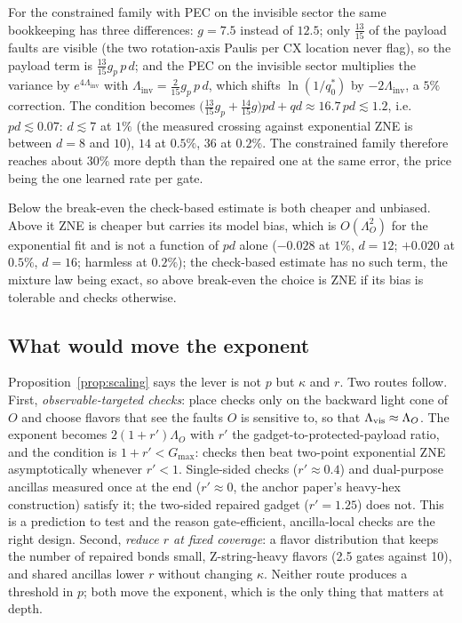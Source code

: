 \documentclass[11pt,a4paper]{article}
\theoremstyle{remark}
\newcommand{\inv}{\mathrm{inv}}
\begin{document}
For the constrained family with PEC on the invisible sector the same bookkeeping has three differences: $g=7.5$ instead of $12.5$; only $\tfrac{13}{15}$ of the payload faults are visible (the two rotation-axis Paulis per CX location never flag), so the payload term is $\tfrac{13}{15}g_p\,p\,d$; and the PEC on the invisible sector multiplies the variance by $e^{4\Lambda_\inv}$ with $\Lambda_\inv=\tfrac{2}{15}g_p\,p\,d$, which shifts $\ln(1/q_0^\ast)$ by $-2\Lambda_\inv$, a $5\%$ correction. The condition becomes $\bigl(\tfrac{13}{15}g_p+\tfrac{14}{15}g\bigr)pd+qd\approx16.7\,pd\lesssim1.2$, i.e.\ $pd\lesssim0.07$: $d\lesssim7$ at $1\%$ (the measured crossing against exponential ZNE is between $d=8$ and $10$), $14$ at $0.5\%$, $36$ at $0.2\%$. The constrained family therefore reaches about $30\%$ more depth than the repaired one at the same error, the price being the one learned rate per gate.

Below the break-even the check-based estimate is both cheaper and unbiased. Above it ZNE is cheaper but carries its model bias, which is $O(\Lambda_O^2)$ for the exponential fit and is not a function of $pd$ alone ($-0.028$ at $1\%$, $d=12$; $+0.020$ at $0.5\%$, $d=16$; harmless at $0.2\%$); the check-based estimate has no such term, the mixture law being exact, so above break-even the choice is ZNE if its bias is tolerable and checks otherwise.

\subsection{What would move the exponent}

Proposition~\ref{prop:scaling} says the lever is not $p$ but $\kappa$ and $r$. Two routes follow. First, \emph{observable-targeted checks}: place checks only on the backward light cone of $O$ and choose flavors that see the faults $O$ is sensitive to, so that $\Lambda_{\rm vis}\approx\Lambda_O$. The exponent becomes $2(1+r')\Lambda_O$ with $r'$ the gadget-to-protected-payload ratio, and the condition is $1+r'<G_{\max}$: checks then beat two-point exponential ZNE asymptotically whenever $r'<1$. Single-sided checks ($r'\approx0.4$) and dual-purpose ancillas measured once at the end ($r'\approx0$, the anchor paper's heavy-hex construction) satisfy it; the two-sided repaired gadget ($r'=1.25$) does not. This is a prediction to test and the reason gate-efficient, ancilla-local checks are the right design. Second, \emph{reduce $r$ at fixed coverage}: a flavor distribution that keeps the number of repaired bonds small, Z-string-heavy flavors (2.5 gates against 10), and shared ancillas lower $r$ without changing $\kappa$. Neither route produces a threshold in $p$; both move the exponent, which is the only thing that matters at depth.
\end{document}
